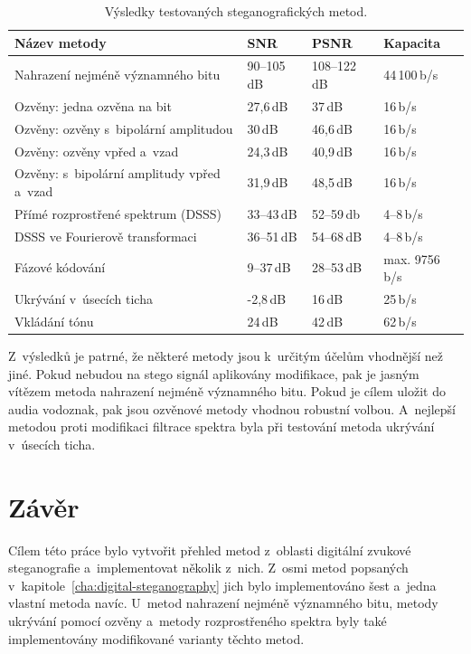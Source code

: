 \begin{table}[H]
    \vskip6pt
    \caption{Výsledky testovaných steganografických metod.}
    \vskip6pt
    \centering
    \begin{tabular}{llll}
        \toprule
        Název metody & SNR & PSNR & Kapacita \\
        \midrule
        Nahrazení nejméně významného bitu          & 90--105\,dB & 108--122\,dB & 44\,100\,b/s \\
        Ozvěny: jedna ozvěna na bit                & 27,6\,dB    & 37\,dB       & 16\,b/s \\
        Ozvěny: ozvěny s~bipolární amplitudou      & 30\,dB      & 46,6\,dB     & 16\,b/s \\
        Ozvěny: ozvěny vpřed a~vzad                & 24,3\,dB    & 40,9\,dB     & 16\,b/s \\
        Ozvěny: s~bipolární amplitudy vpřed a~vzad & 31,9\,dB    & 48,5\,dB     & 16\,b/s \\
        Přímé rozprostřené spektrum (DSSS)         & 33--43\,dB  & 52--59\,db   & 4--8\,b/s \\
        DSSS ve Fourierově transformaci            & 36--51\,dB  & 54--68\,dB   & 4--8\,b/s \\
        Fázové kódování                            & 9--37\,dB   & 28--53\,dB   & max. 9756\,b/s \\
        Ukrývání v~úsecích ticha                   & -2,8\,dB    & 16\,dB       & 25\,b/s \\
        Vkládání tónu                              & 24\,dB      & 42\,dB       & 62\,b/s \\
        \bottomrule
    \end{tabular}
    \label{tab:results-summary}
\end{table}

Z~výsledků je patrné, že některé metody jsou k~určitým účelům vhodnější než
jiné. Pokud nebudou na stego signál aplikovány modifikace, pak je jasným
vítězem metoda nahrazení nejméně významného bitu. Pokud je cílem uložit do
audia vodoznak, pak jsou ozvěnové metody vhodnou robustní volbou. A~nejlepší
metodou proti modifikaci filtrace spektra byla při testování metoda ukrývání
v~úsecích ticha.


\chapter{Závěr}
\label{cha:conclusion}

Cílem této práce bylo vytvořit přehled metod z~oblasti digitální zvukové
steganografie a~implementovat několik z~nich. Z~osmi metod popsaných
v~kapitole~\ref{cha:digital-steganography} jich bylo implementováno šest
a~jedna vlastní metoda navíc. U~metod nahrazení nejméně významného bitu, metody
ukrývání pomocí ozvěny a~metody rozprostřeného spektra byly také implementovány
modifikované varianty těchto metod.

